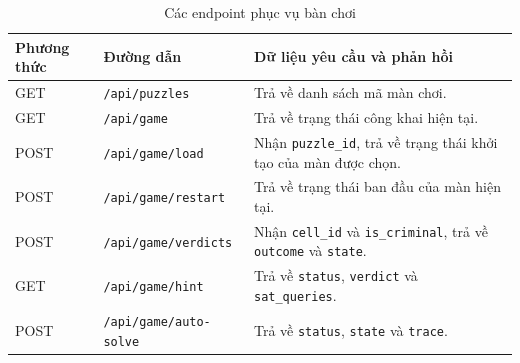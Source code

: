 \begin{table}[htbp]
    \centering
    \caption{Các endpoint phục vụ bàn chơi}
    \label{tab:backend-endpoints}
    \small
    \begin{tabularx}{\linewidth}{
        @{}l l >{\raggedright\arraybackslash}X@{}
    }
        \toprule
        \textbf{Phương thức} & \textbf{Đường dẫn}
            & \textbf{Dữ liệu yêu cầu và phản hồi} \\
        \midrule
        GET & \nolinkurl{/api/puzzles}
            & Trả về danh sách mã màn chơi. \\
        GET & \nolinkurl{/api/game}
            & Trả về trạng thái công khai hiện tại. \\
        POST & \nolinkurl{/api/game/load}
            & Nhận \texttt{puzzle\_id}, trả về trạng thái khởi tạo
              của màn được chọn. \\
        POST & \nolinkurl{/api/game/restart}
            & Trả về trạng thái ban đầu của màn hiện tại. \\
        POST & \nolinkurl{/api/game/verdicts}
            & Nhận \texttt{cell\_id} và \texttt{is\_criminal},
              trả về \texttt{outcome} và \texttt{state}. \\
        GET & \nolinkurl{/api/game/hint}
            & Trả về \texttt{status}, \texttt{verdict} và
              \texttt{sat\_queries}. \\
        POST & \nolinkurl{/api/game/auto-solve}
            & Trả về \texttt{status}, \texttt{state} và
              \texttt{trace}. \\
        \bottomrule
    \end{tabularx}
\end{table}
\label{sec:ui_api_flow}
